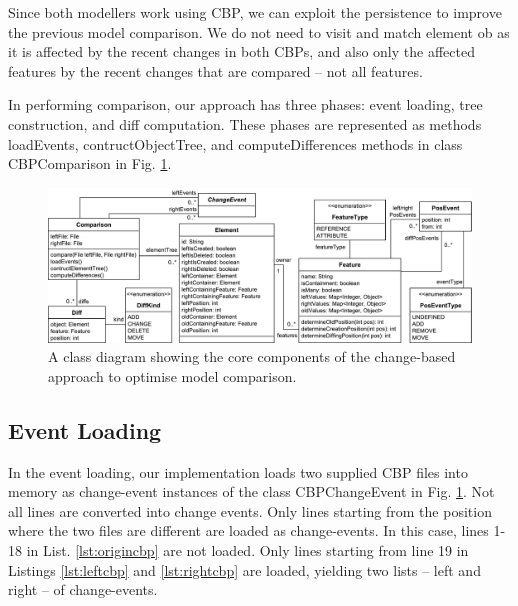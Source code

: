 \documentclass{llncs}
\begin{document}
Since both modellers work using CBP, we can exploit the persistence to improve the previous model comparison. We do not need to visit and match element \textsf{ob} as it is affected by the recent changes in both CBPs, and also only the affected features by the recent changes that are compared -- not all features. 

In performing comparison, our approach has three phases: event loading, tree construction, and diff computation. These phases are represented as methods \textsf{loadEvents}, \textsf{contructObjectTree}, and \textsf{computeDifferences} methods in class \textsf{CBPComparison} in Fig. \ref{fig:approach_class_diagram}. 

\begin{figure}
    \includegraphics[width=\linewidth]{images/TreeClassDiagram}
    \caption{A class diagram showing the core components of the change-based approach to optimise model comparison.}
    \label{fig:approach_class_diagram}
\end{figure}

\subsection{Event Loading}
\label{sec:event_loading}
In the event loading, our implementation loads two supplied CBP files into memory as change-event instances of the class \textsf{CBPChangeEvent} in Fig. \ref{fig:approach_class_diagram}. Not all lines are converted into change events. Only lines starting from the position where the two files are different are loaded as change-events. In this case, lines 1-18 in List. \ref{lst:origincbp} are not loaded. Only lines starting from line 19 in Listings \ref{lst:leftcbp} and \ref{lst:rightcbp} are loaded, yielding two lists -- left and right -- of change-events. 
\end{document}

